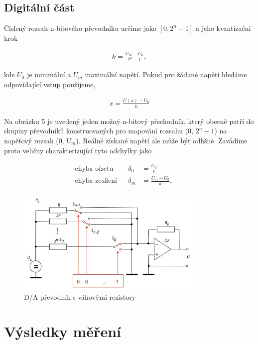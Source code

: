 \documentclass[a4paper,11pt]{article}
\begin{document}
\subsection{Digitální část}

Číslený rozsah n-bitového převodníku určíme jako $[0, 2^n -1]$ a jeho kvantizační krok 

\begin{align}
  k = \frac{U_m - U_0}{2^n -1},
\end{align}

\noindent
kde $U_0$ je minimální a $U_m$ maximální napětí. Pokud pro žádané napětí hledáme odpovídající vstup použijeme,

\begin{align}
  x = \frac{U(x) - U_0}{k}
\end{align}

Na obrázku 5 je uvedený jeden možný n-bitový přechodník, který obecně patří do skupiny převodníků konstruovaných pro mapování rozsahu (0, $2^n -1$) na napěťový rozsah (0, $U_m$). Reálné získané napětí ale může být odlišné. Zavádíme proto veličny charakterizující tyto odchylky jako

\begin{align}
  \text{chyba ofsetu} & & \delta_0 &= \frac{U_0}{k} & &\\
  \text{chyba zesílení} & & \delta_m &= \frac{U_m - U_0}{k},
\end{align}

\begin{figure}[htpb]
  \centering
  \includegraphics[width=0.8\textwidth]{da_prevodnik.jpg}
  \caption{D/A převodník s váhovými rezistory}
\end{figure}

\newpage

\section{Výsledky měření}
\end{document}
